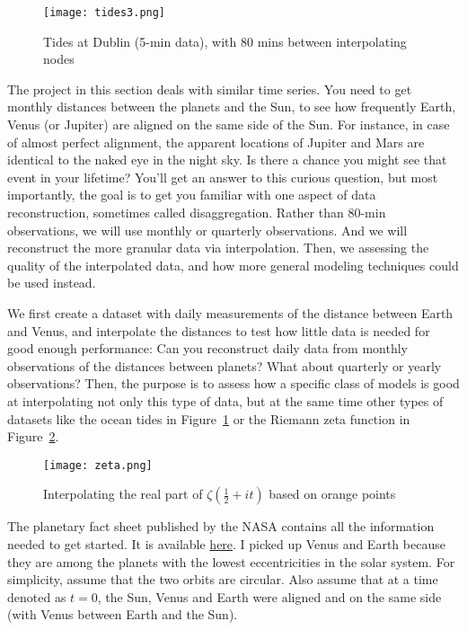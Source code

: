 \documentclass[oneside,10pt]{book}
\begin{document}
\begin{figure}[H]
\centering
\texttt{[image: tides3.png]} %
\caption{Tides at Dublin (5-min data), with 80 mins between interpolating nodes}
\label{fig:tides}
\end{figure}

The project in this section deals with similar time series. You need to get monthly distances between the planets and the Sun, to see how frequently Earth, Venus (or Jupiter) are aligned on the same side of the Sun. For instance, in case of almost perfect alignment, the apparent locations of Jupiter and Mars are identical to the naked eye in the night sky. Is there a chance you might see that event in your lifetime? You'll get an answer to this curious question, but most importantly, the goal is to get you familiar with one aspect of data reconstruction, sometimes
 called \textcolor{index}{disaggregation}. Rather than 80-min observations, we will use monthly or quarterly observations. And we will reconstruct the more granular data via interpolation. Then, we assessing the quality of the interpolated data, and how more general modeling techniques could be used instead.


We first create a dataset with daily measurements of the distance between Earth and Venus, and interpolate the distances to test how little data is needed for good enough performance: 
Can you reconstruct daily data from monthly observations of the distances between planets? What about quarterly or yearly observations? Then, the purpose is to assess how a specific class of models is good at interpolating not only this type of data, but at the same time other types of datasets like the ocean tides in Figure~\ref{fig:tides} or the Riemann zeta function in
 Figure~\ref{fig:zeta}.

\begin{figure}[H]
\centering
\texttt{[image: zeta.png]} %
\caption{Interpolating the real part of $\zeta(\frac{1}{2}+it)$ based on orange points}
\label{fig:zeta}
\end{figure}

The planetary fact sheet published by the NASA contains all the information needed to get started. 
It is available \href{https://nssdc.gsfc.nasa.gov/planetary/factsheet/}{here}. I picked up Venus and Earth because they are among the planets with the lowest eccentricities in the solar system. For simplicity, assume that the two orbits are circular. Also assume that at a time denoted as $t=0$, the Sun, Venus and Earth were aligned and on the same side (with Venus between Earth and the Sun). 
\end{document}
